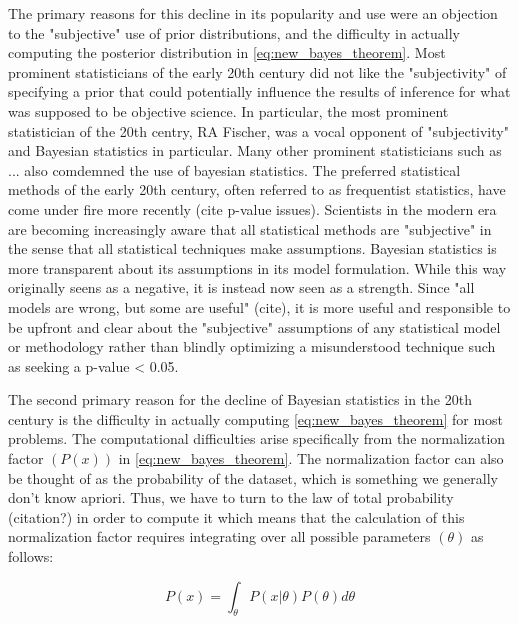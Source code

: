 The primary reasons for this decline in its popularity and use were an objection to the "subjective" use of prior distributions, and the difficulty in actually computing the posterior distribution in \ref{eq:new_bayes_theorem}. Most prominent statisticians of the early 20th century did not like the "subjectivity" of specifying a prior that could potentially influence the results of inference for what was supposed to be objective science. In particular, the most prominent statistician of the 20th centry, RA Fischer, was a vocal opponent of "subjectivity" and Bayesian statistics in particular. Many other prominent statisticians such as ... also comdemned the use of bayesian statistics. The preferred statistical methods of the early 20th century, often referred to as frequentist statistics, have come under fire more recently (cite p-value issues). Scientists in the modern era are becoming increasingly aware that all statistical methods are "subjective" in the sense that all statistical techniques make assumptions. Bayesian statistics is more transparent about its assumptions in its model formulation. While this way originally seens as a negative, it is instead now seen as a strength. Since "all models are wrong, but some are useful" (cite), it is more useful and responsible to be upfront and clear about the "subjective" assumptions of any statistical model or methodology rather than blindly optimizing a misunderstood technique such as seeking a p-value < 0.05.

The second primary reason for the decline of Bayesian statistics in the 20th century is the difficulty in actually computing \ref{eq:new_bayes_theorem} for most problems. The computational difficulties arise specifically from the normalization factor $(P(x))$ in \ref{eq:new_bayes_theorem}. The normalization factor can also be thought of as the probability of the dataset, which is something we generally don't know apriori. Thus, we have to turn to the law of total probability (citation?) in order to compute it which means that the calculation of this normalization factor requires integrating over all possible parameters $(\theta)$ as follows:

\begin{equation} \label{eq:normalization_factor}
P(x) = \int_{\theta} P(x|\theta)P(\theta) d\theta
\end{equation}

